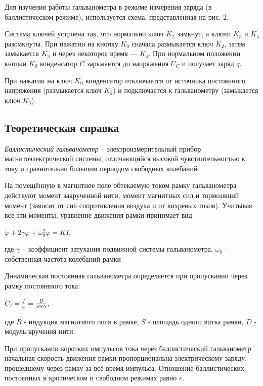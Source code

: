 \documentclass[a4paper, 12pt]{article}
\begin{document}
Для изучения работы гальванометра в режиме измерения заряда (в баллистическом режиме), используется схема, представленная на рис. 2.

Система ключей устроена так, что нормально ключ $K_2$ замкнут, а ключи $K_3$ и $K_4$ разомкнуты. При нажатии на кнопку $K_0$ сначала размыкается ключ $K_2$, затем замыкается $K_3$ и через некоторое время — $K_4$. При нормальном положении кнопки $K_0$ конденсатор $C$ заряжается до напряжения $U_C$ и получает заряд $q$.

При нажатии на ключ $K_0$ конденсатор отключается от источника постоянного напряжения (размыкается ключ $K_2$) и подключается к гальванометру (замыкается ключ $K_3$).

\begin{center}


\bigskip

\subsection*{Теоретическая справка}
\end{center}
\textit{Баллистический гальванометр} -- электроизмерительный прибор магнитоэлектрической системы, отличающийся высокой чувствительностью к току и сравнительно большим периодом свободных колебаний. \par
На помещённую в магнитное поле обтекаемую током рамку гальванометра действуют момент закрученной нити, момент магнитных сил и тормозящий момент (зависит от сил сопротивления воздуха и от вихревых токов). Учитывая все эти моменты, уравнение движения рамки принимает вид
\begin{center}
    $\ddot \varphi + 2 \gamma \dot \varphi + \omega_0^2\varphi = KI $,
\end{center}
где $\gamma$ -- коэффициент затухания подвижной системы гальванометра, $\omega_0$ -- собственная частота колебаний рамки

Динамическая постоянная гальванометра определяется при пропускании через рамку постоянного тока:
\begin{center}
    $C_I = \frac{I}{\varphi} = \frac{D}{BSN}$,
\end{center}
где $B$ - индукция магнитного поля в рамке, $S$ - площадь одного витка рамки, $D$ - модуль кручения нити. \par
При пропускании коротких импульсов тока через баллистический гальванометр начальная скорость движения рамки пропорциональна электрическому заряду, прошедшему через рамку за всё время импульса. Отношение баллистических постоянных в критическом и свободном режимах равно $e$.
\end{document}
